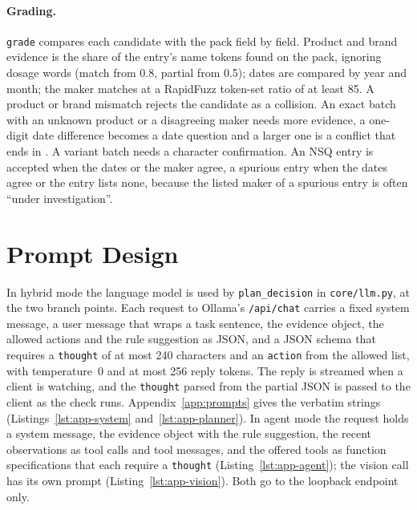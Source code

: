 \paragraph{Grading.} \texttt{grade} compares each candidate with the pack field by field. Product and brand evidence is the share of the entry's name tokens found on the pack, ignoring dosage words (match from 0.8, partial from 0.5); dates are compared by year and month; the maker matches at a RapidFuzz token-set ratio of at least 85. A product or brand mismatch rejects the candidate as a collision. An exact batch with an unknown product or a disagreeing maker needs more evidence, a one-digit date difference becomes a date question and a larger one is a conflict that ends in \CANTV{}. A variant batch needs a character confirmation. An NSQ entry is accepted when the dates or the maker agree, a spurious entry when the dates agree or the entry lists none, because the listed maker of a spurious entry is often ``under investigation''.

\section{Prompt Design}
\label{sec:impl-prompt-design}

In hybrid mode the language model is used by \texttt{plan\_decision} in \texttt{core/llm.py}, at the two branch points. Each request to Ollama's \texttt{/api/chat} carries a fixed system message, a user message that wraps a task sentence, the evidence object, the allowed actions and the rule suggestion as JSON, and a JSON schema that requires a \texttt{thought} of at most 240 characters and an \texttt{action} from the allowed list, with temperature~0 and at most 256 reply tokens. The reply is streamed when a client is watching, and the \texttt{thought} parsed from the partial JSON is passed to the client as the check runs. Appendix~\ref{app:prompts} gives the verbatim strings (Listings~\ref{lst:app-system} and~\ref{lst:app-planner}). In agent mode the request holds a system message, the evidence object with the rule suggestion, the recent observations as tool calls and tool messages, and the offered tools as function specifications that each require a \texttt{thought} (Listing~\ref{lst:app-agent}); the vision call has its own prompt (Listing~\ref{lst:app-vision}). Both go to the loopback endpoint only.


